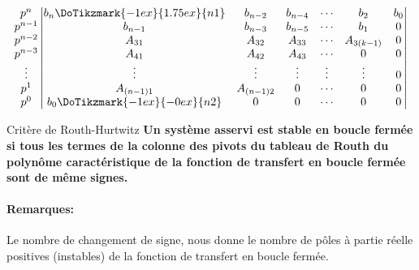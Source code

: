 \[
\begin{matrix}
    p^n    \\
    p^{n-1}\\
    p^{n-2}\\
    p^{n-3}\\
    \vdots \\
    p^1    \\
    p^0    \\
\end{matrix}
\begin{vmatrix}
    b_n\DoTikzmark{-1ex}{1.75ex}{n1} & b_{n-2} & b_{n-4}& \cdots & b_2  & b_0\\
    b_{n-1}              & b_{n-3}   & b_{n-5} & \cdots & b_1      & 0 \\
    A_{31}               & A_{32}    & A_{33}  & \cdots & A_{3(k-1)} & 0 \\
    A_{41}               & A_{42}    & A_{43}  & \cdots & 0        & 0 \\
    \vdots               & \vdots    & \vdots  & \vdots & \vdots   & 0 \\
    A_{(n-1)1}           & A_{(n-1)2}& 0       & \cdots & 0        & 0 \\
    b_0\DoTikzmark{-1ex}{-0ex}{n2}    & 0       & 0      & \cdots & 0 & 0
\end{vmatrix}
\]
\begin{criteria}{Critère de Routh-Hurtwitz}
    \textbf{Un système asservi est stable en boucle fermée
            si tous les termes de la colonne des pivots 
            du tableau de Routh du polynôme caractéristique 
            de la fonction de transfert en boucle fermée sont de même signes.}
\end{criteria}
\paragraph{Remarques:}
Le nombre de changement de signe, nous donne le nombre de pôles à partie 
réelle positives (instables) de la fonction de transfert en boucle fermée.
